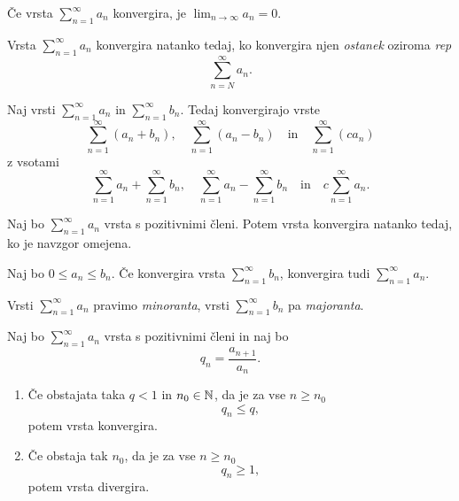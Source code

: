 \documentclass[12pt, a4paper]{article}
\begin{document}
\obvs

\begin{posledica}
Če vrsta $\displaystyle\sum_{n=1}^\infty a_n$ konvergira, je $\displaystyle\lim_{n\to\infty}a_n=0$.
\end{posledica}

\obvs

\begin{opomba}
Vrsta $\displaystyle\sum_{n=1}^\infty a_n$ konvergira natanko tedaj, ko konvergira njen \emph{ostanek} oziroma \emph{rep}
\[
\sum_{n=N}^\infty a_n.
\]
\end{opomba}

\begin{trditev}
Naj vrsti $\displaystyle\sum_{n=1}^\infty a_n$ in $\displaystyle\sum_{n=1}^\infty b_n$. Tedaj konvergirajo vrste
\[
\sum_{n=1}^\infty (a_n+b_n),\quad \sum_{n=1}^\infty (a_n-b_n)\quad\text{in}\quad \sum_{n=1}^\infty(ca_n)
\]
z vsotami
\[
\sum_{n=1}^\infty a_n+\sum_{n=1}^\infty b_n,\quad \sum_{n=1}^\infty a_n-\sum_{n=1}^\infty b_n\quad\text{in}\quad c\sum_{n=1}^\infty a_n.
\]
\end{trditev}

\obvs

\begin{trditev}
Naj bo $\displaystyle\sum_{n=1}^\infty a_n$ vrsta s pozitivnimi členi. Potem vrsta konvergira natanko tedaj, ko je navzgor omejena.
\end{trditev}

\obvs

\begin{trditev}
Naj bo $0\leq a_n\leq b_n$. Če konvergira vrsta $\displaystyle\sum_{n=1}^\infty b_n$, konvergira tudi $\displaystyle\sum_{n=1}^\infty a_n$.
\end{trditev}

\obvs

\begin{opomba}
Vrsti $\displaystyle\sum_{n=1}^\infty a_n$ pravimo \emph{minoranta}, vrsti $\displaystyle\sum_{n=1}^\infty b_n$ pa \emph{majoranta}.
\end{opomba}

\begin{izrek}
Naj bo $\displaystyle\sum_{n=1}^\infty a_n$ vrsta s pozitivnimi členi in naj bo
\[
q_n=\frac{a_{n+1}}{a_n}.
\]

\begin{enumerate}[label=\roman*)]
\item Če obstajata taka $q<1$ in $n_0\in\mathbb{N}$, da je za vse $n\geq n_0$
\[
q_n\leq q,
\]
potem vrsta konvergira.
\item Če obstaja tak $n_0$, da je za vse $n\geq n_0$
\[
q_n\geq 1,
\]
potem vrsta divergira.
\end{enumerate}
\end{izrek}
\end{document}
